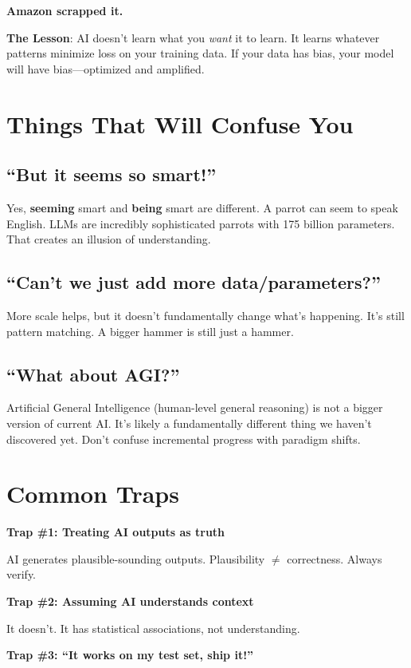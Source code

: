 \documentclass[11pt,oneside]{book}
\begin{document}
\textbf{Amazon scrapped it.}

\textbf{The Lesson}: AI doesn't learn what you \textit{want} it to learn. It learns whatever patterns minimize loss on your training data. If your data has bias, your model will have bias---optimized and amplified.

\section{Things That Will Confuse You}

\subsection{``But it seems so smart!''}
Yes, \textbf{seeming} smart and \textbf{being} smart are different. A parrot can seem to speak English. LLMs are incredibly sophisticated parrots with 175 billion parameters. That creates an illusion of understanding.

\subsection{``Can't we just add more data/parameters?''}
More scale helps, but it doesn't fundamentally change what's happening. It's still pattern matching. A bigger hammer is still just a hammer.

\subsection{``What about AGI?''}
Artificial General Intelligence (human-level general reasoning) is not a bigger version of current AI. It's likely a fundamentally different thing we haven't discovered yet. Don't confuse incremental progress with paradigm shifts.

\section{Common Traps}

\textbf{Trap \#1: Treating AI outputs as truth}

AI generates plausible-sounding outputs. Plausibility \(\neq\) correctness. Always verify.

\textbf{Trap \#2: Assuming AI understands context}

It doesn't. It has statistical associations, not understanding.

\textbf{Trap \#3: ``It works on my test set, ship it!''}
\end{document}
